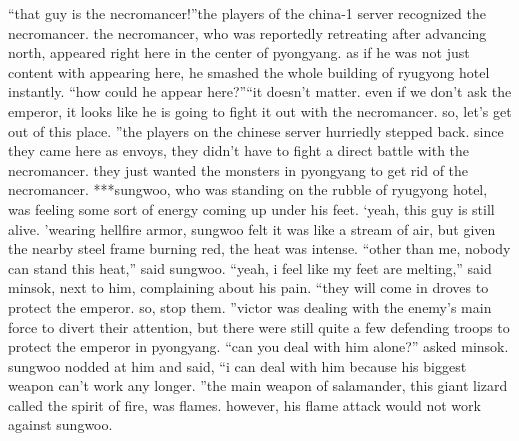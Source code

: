 “that guy is the necromancer!”the players of the china-1 server recognized the necromancer.
 the necromancer, who was reportedly retreating after advancing north, appeared right here in the center of pyongyang.
as if he was not just content with appearing here, he smashed the whole building of ryugyong hotel instantly.
“how could he appear here?”“it doesn’t matter.
 even if we don’t ask the emperor, it looks like he is going to fight it out with the necromancer.
 so, let’s get out of this place.
”the players on the chinese server hurriedly stepped back.
 since they came here as envoys, they didn’t have to fight a direct battle with the necromancer.
they just wanted the monsters in pyongyang to get rid of the necromancer.
***sungwoo, who was standing on the rubble of ryugyong hotel, was feeling some sort of energy coming up under his feet.
‘yeah, this guy is still alive.
’wearing hellfire armor, sungwoo felt it was like a stream of air, but given the nearby steel frame burning red, the heat was intense.
“other than me, nobody can stand this heat,” said sungwoo.
“yeah, i feel like my feet are melting,” said minsok, next to him, complaining about his pain.
“they will come in droves to protect the emperor.
 so, stop them.
”victor was dealing with the enemy’s main force to divert their attention, but there were still quite a few defending troops to protect the emperor in pyongyang.
“can you deal with him alone?” asked minsok.
sungwoo nodded at him and said, “i can deal with him because his biggest weapon can’t work any longer.
”the main weapon of salamander, this giant lizard called the spirit of fire, was flames.
 however, his flame attack would not work against sungwoo.

